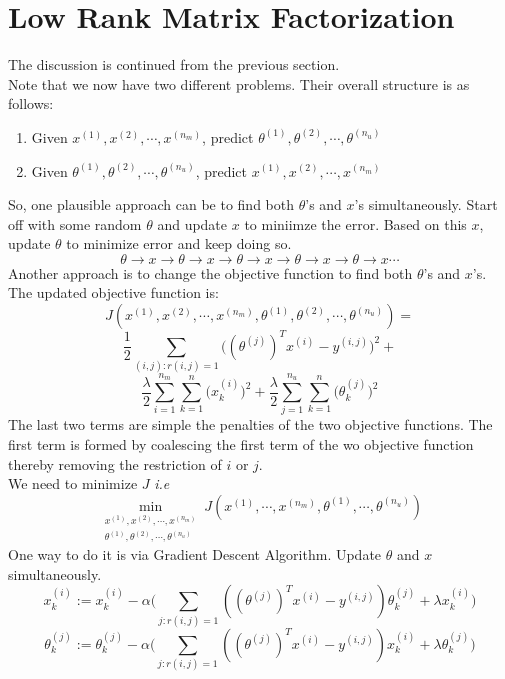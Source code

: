 \documentclass[twocolumn]{article}
\begin{document}
\section*{Low Rank Matrix Factorization}
The discussion is continued from the previous section.\\
\newline
Note that we now have two different problems. Their overall structure is as follows:
\begin{enumerate}
\item Given $x^{(1)},x^{(2)},\cdots,x^{(n_m)}$, predict $\theta^{(1)},\theta^{(2)},\cdots,\theta^{(n_u)}$
\item Given $\theta^{(1)},\theta^{(2)},\cdots,\theta^{(n_u)}$, predict $x^{(1)},x^{(2)},\cdots,x^{(n_m)}$
\end{enumerate}
So, one plausible approach can be to find both $\theta$'s and $x$'s simultaneously. Start off with some random $\theta$ and update $x$ to miniimze the error. Based on this $x$, update $\theta$ to minimize error and keep doing so.
$$\theta \rightarrow x \rightarrow \theta \rightarrow x \rightarrow \theta \rightarrow x \rightarrow \theta \rightarrow x \rightarrow \theta \rightarrow x \cdots$$
Another approach is to change the objective function to find both $\theta$'s and $x$'s. The updated objective function is:
$$J(x^{(1)},x^{(2)},\cdots,x^{(n_m)},\theta^{(1)},\theta^{(2)},\cdots,\theta^{(n_u)})=$$
$$\frac{1}{2}\displaystyle\sum\limits_{(i,j):r(i,j)=1} \Big((\theta^{(j)})^Tx^{(i)}-y^{(i,j)}\Big)^2 +$$ 
$$\frac{\lambda}{2}\displaystyle\sum\limits_{i=1}^{n_m} \displaystyle\sum\limits_{k=1}^{n} \Big(x_k^{(i)}\Big)^2+\frac{\lambda}{2}\displaystyle\sum\limits_{j=1}^{n_u} \displaystyle\sum\limits_{k=1}^{n} \Big(\theta_k^{(j)}\Big)^2$$
The last two terms are simple the penalties of the two objective functions. The first term is formed by coalescing the first term of the wo objective function thereby removing the restriction of $i$ or $j$.\\
\newline
We need to minimize $J$ \emph{i.e}
$$\min_{\substack{x^{(1)},x^{(2)},\cdots,x^{(n_m)}\\ \theta^{(1)},\theta^{(2)},\cdots,\theta^{(n_u)}}} J(x^{(1)},\cdots,x^{(n_m)},\theta^{(1)},\cdots,\theta^{(n_u)})$$
One way to do it is via Gradient Descent Algorithm. Update $\theta$ and $x$ simultaneously.
$$x_k^{(i)} := x_k^{(i)} - \alpha\Big(\displaystyle\sum\limits_{j:r(i,j)=1}((\theta^{(j)})^Tx^{(i)}-y^{(i,j)})\theta_k^{(j)}+\lambda x_k^{(i)}\Big)$$
$$\theta_k^{(j)} := \theta_k^{(j)} - \alpha\Big(\displaystyle\sum\limits_{j:r(i,j)=1}((\theta^{(j)})^Tx^{(i)}-y^{(i,j)})x_k^{(i)}+\lambda \theta_k^{(j)}\Big)$$
\end{document}
